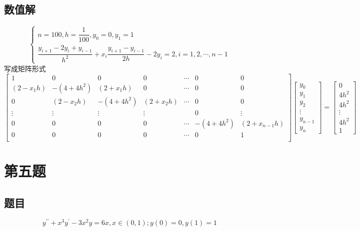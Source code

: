 \documentclass{ctexart}
\numberwithin{equation}{section}
\begin{document}
\subsection{数值解}
\begin{equation}
    \left\{
        \begin{array}{l}
            n = 100,h=\dfrac{1}{100},y_0=0,y_1=1\\
            \dfrac{y_{i+1}-2y_{i}+y_{i-1}}{h^2}+x_i\dfrac{y_{i+1}-y_{i-1}}{2h}-2y_i=2,i = 1,2,\cdots,n-1
        \end{array}
            \right.
\end{equation}
写成矩阵形式
\begin{equation}
    \begin{bmatrix}
        1 & 0 & 0 & 0 & \cdots & 0 & 0\\
        (2-x_1h) & -(4+4h^2) & (2+x_1h) & 0 & \cdots & 0 & 0\\
        0 & (2-x_2h) & -(4+4h^2) & (2+x_2h) & \cdots & 0 & 0\\
        \vdots & \vdots & \vdots & \vdots &  & 0 & \vdots\\
        0 & 0 & 0 & 0 & \cdots & -(4+4h^2) & (2+x_{n-1}h)\\
        0 & 0 & 0 & 0 & \cdots & 0 & 1\\
    \end{bmatrix}
    \begin{bmatrix}
        y_0\\
        y_1\\
        y_2\\
        \vdots\\
        y_{n-1}\\
        y_n
    \end{bmatrix}
    =
    \begin{bmatrix}
        0\\
        4h^2\\
        4h^2\\
        \vdots\\
        4h^2\\
        1
    \end{bmatrix}
\end{equation}
\section{第五题}
\subsection{题目}
\[y^{\prime \prime}+x^{3} y^{\prime}-3 x^{2} y=6 x, x \in(0,1) ; y(0)=0, y(1)=1 \]
\end{document}
